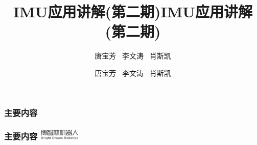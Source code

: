 \documentclass[10pt,aspectratio=43,mathserif]{beamer}
\title{IMU应用讲解(第二期)}
\author{唐宝芳 \ 李文涛 \ 肖斯凯}
\date{\zhtoday}
\begin{document}
\setlength{\abovedisplayskip}{1ex}%
\setlength{\belowdisplayskip}{1ex}%

\begin{frame}
	\title{IMU应用讲解(第二期)}
	\author{唐宝芳 \ 李文涛 \ 肖斯凯} %
\titlepage
\end{frame}

\begin{frame}
	\frametitle{主要内容}
  \frametitle{主要内容 \hfill \includegraphics[height=0.5cm]{00_logo.png}}
	
	\tableofcontents[hideallsubsections]
  \addtocounter{framenumber}{-1}  %
\end{frame}

		
	


% 






% 
% 
% 




\end{document}
